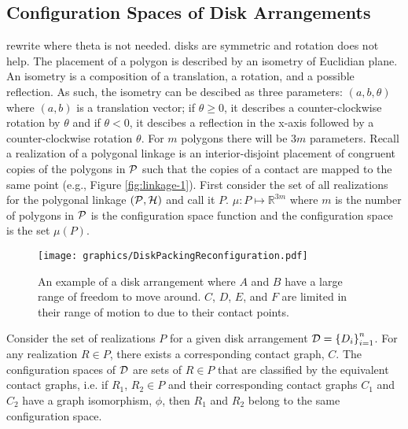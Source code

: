 \documentclass[10pt]{CSUNthesis}
\theoremstyle{plain}%
\theoremstyle{definition}
\theoremstyle{remark}
\newcommand{\HH}{{\cal H}} %
\renewcommand{\PP}{{\cal P}} %
\newcommand{\DD}{{\cal D}} %
\newcommand{\bbR}{{\mathbb{R}}}
\newcommand{\lr}[1]{\left( #1 \right)}
\begin{document}
 \subsection{Configuration Spaces of Disk Arrangements}
rewrite where theta is not needed.  disks are symmetric and rotation does not help.
The placement of a polygon is described by an isometry of Euclidian plane.
An isometry is a composition of a translation, a rotation, and a possible reflection.
As such, the isometry can be descibed as three parameters: $\lr{a,b,\theta}$ where $(a,b)$ is a translation vector; if $\theta \geq 0$, it describes a counter-clockwise rotation by $\theta$ and if $\theta < 0$, it descibes a reflection in the x-axis followed by a counter-clockwise rotation $\theta$.
For $m$ polygons there will be $3 m$ parameters.
Recall a realization of a polygonal linkage is an interior-disjoint placement of congruent copies of the polygons in $\PP$ such that the copies of a contact are mapped to the same point (e.g., Figure \ref{fig:linkage-1}).
First consider the set of all realizations for the polygonal linkage $\left(\PP,\HH\right)$ and call it $P$.  
$\mu:P \mapsto \bbR^{3m}$ where $m$ is the number of polygons in $\PP$ is the configuration space function and the configuration space is the set $\mu(P)$. 

\begin{figure}[!htbp]
\begin{center}
\texttt{[image: graphics/DiskPackingReconfiguration.pdf]}
\end{center} 
\caption{An example of a disk arrangement where $A$ and $B$ have a large range of freedom to move around.  $C$, $D$, $E$, and $F$ are limited in their range of motion to due to their contact points.}
\label{fig:configuration-5}
\end{figure}

Consider the set of realizations $P$ for a given disk arrangement $\DD = \left\lbrace D_i \right\rbrace_{i=1}^n$.  For any realization $R \in P$, there exists a corresponding contact graph, $C$.  The configuration spaces of $\DD$ are sets of $R \in P$ that are classified by the equivalent contact graphs, i.e. if $R_1$, $R_2 \in P$ and their corresponding contact graphs $C_1$ and $C_2$ have a graph isomorphism, $\phi$, then $R_1$ and $R_2$ belong to the same configuration space.





\end{document}
